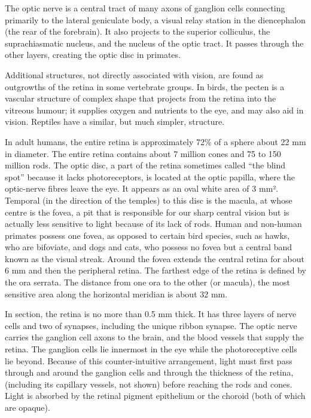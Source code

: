 The optic nerve is a central tract of many axons of ganglion cells connecting primarily to the lateral geniculate body, a visual relay station in the diencephalon (the rear of the forebrain). It also projects to the superior colliculus, the suprachiasmatic nucleus, and the nucleus of the optic tract. It passes through the other layers, creating the optic disc in primates.

Additional structures, not directly associated with vision, are found as outgrowths of the retina in some vertebrate groups. In birds, the pecten is a vascular structure of complex shape that projects from the retina into the vitreous humour; it supplies oxygen and nutrients to the eye, and may also aid in vision. Reptiles have a similar, but much simpler, structure.

In adult humans, the entire retina is approximately 72\% of a sphere about 22 mm in diameter. The entire retina contains about 7 million cones and 75 to 150 million rods. The optic disc, a part of the retina sometimes called ``the blind spot'' because it lacks photoreceptors, is located at the optic papilla, where the optic-nerve fibres leave the eye. It appears as an oval white area of 3 mm². Temporal (in the direction of the temples) to this disc is the macula, at whose centre is the fovea, a pit that is responsible for our sharp central vision but is actually less sensitive to light because of its lack of rods. Human and non-human primates possess one fovea, as opposed to certain bird species, such as hawks, who are bifoviate, and dogs and cats, who possess no fovea but a central band known as the visual streak. Around the fovea extends the central retina for about 6 mm and then the peripheral retina. The farthest edge of the retina is defined by the ora serrata. The distance from one ora to the other (or macula), the most sensitive area along the horizontal meridian is about 32 mm.

In section, the retina is no more than 0.5 mm thick. It has three layers of nerve cells and two of synapses, including the unique ribbon synapse. The optic nerve carries the ganglion cell axons to the brain, and the blood vessels that supply the retina. The ganglion cells lie innermost in the eye while the photoreceptive cells lie beyond. Because of this counter-intuitive arrangement, light must first pass through and around the ganglion cells and through the thickness of the retina, (including its capillary vessels, not shown) before reaching the rods and cones. Light is absorbed by the retinal pigment epithelium or the choroid (both of which are opaque).

